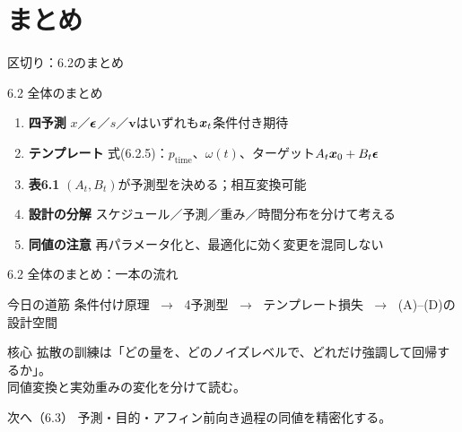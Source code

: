 \section{まとめ}
\asmain
\begin{frame}{区切り：6.2のまとめ}
    \tableofcontents[currentsection]
\end{frame}
\asmain
\begin{frame}{6.2 全体のまとめ}
    \begin{enumerate}
        \item \textbf{四予測}
        $x$／$\bm{\epsilon}$／$s$／$\bm{v}$はいずれも$\bm{x}_t$条件付き期待
        \item \textbf{テンプレート}
        式(6.2.5)：$p_{\mathrm{time}}$、$\omega(t)$、ターゲット$A_t\bm{x}_0+B_t\bm{\epsilon}$
        \item \textbf{表6.1}
        $(A_t,B_t)$が予測型を決める；相互変換可能
        \item \textbf{設計の分解}
        スケジュール／予測／重み／時間分布を分けて考える
        \item \textbf{同値の注意}
        再パラメータ化と、最適化に効く変更を混同しない
    \end{enumerate}
\end{frame}
\asmain
\begin{frame}{6.2 全体のまとめ：一本の流れ}
    \begin{block}{今日の道筋}
        条件付け原理
        $\;\to\;$
        4予測型
        $\;\to\;$
        テンプレート損失
        $\;\to\;$
        (A)--(D)の設計空間
    \end{block}
    \begin{block}{核心}
        拡散の訓練は「どの量を、どのノイズレベルで、どれだけ強調して回帰するか」。\\
        同値変換と実効重みの変化を分けて読む。
    \end{block}
    \begin{block}{次へ（6.3）}
        予測・目的・アフィン前向き過程の同値を精密化する。
    \end{block}
\end{frame}
